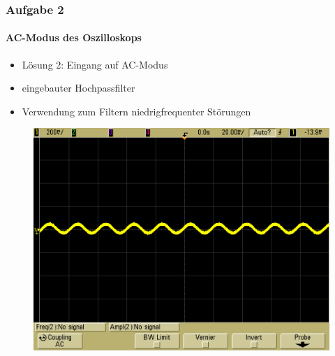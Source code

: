 \begin{frame}
\frametitle{Aufgabe 2}
\framesubtitle{AC-Modus des Oszilloskops}
\begin{itemize}
    \item Lösung 2: Eingang auf AC-Modus
    \item eingebauter Hochpassfilter 
    \item Verwendung zum Filtern niedrigfrequenter Störungen
\end{itemize}
\begin{figure}[H]
\begin{center}
        \includegraphics[scale=0.2]{./img/2c_Testsignal_AC.png}
\end{center}
\end{figure}
\end{frame}
